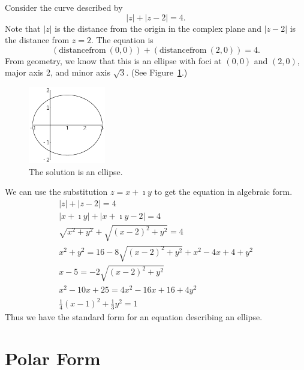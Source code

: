 \begin{Example}
  Consider the curve described by 
  \[
  |z| + |z - 2| = 4.
  \]
  Note that $|z|$ is the distance from the origin in the complex plane and
  $|z - 2|$ is the distance from $z = 2$.  The equation is
  \[ 
  (\mathrm{distance from}\ (0,0)) + (\mathrm{distance from}\ (2,0)) = 4. 
  \]
  From geometry, we know that this is an ellipse with foci at $(0,0)$
  and $(2,0)$, major axis 2, and minor axis $\sqrt{3}$. 
  (See Figure~\ref{ellipse}.)
  \begin{figure}[h!]
    \begin{center}
      \includegraphics[width=0.3\textwidth]{fcv/number/ellipse}
    \end{center}
    \caption{The solution is an ellipse.}
    \label{ellipse}
  \end{figure}

  We can use the substitution $z = x + \imath y$ to get the equation in algebraic 
  form.
  \begin{gather*}
    |z| + |z - 2| = 4 
    \\
    |x + \imath y| + |x + \imath y - 2| = 4 
    \\
    \sqrt{x^2 + y^2} + \sqrt{(x - 2)^2 + y^2} = 4 
    \\
    x^2 + y^2 = 16 - 8 \sqrt{ (x - 2)^2 + y^2 } + x^2 - 4 x + 4 + y^2 
    \\
    x - 5 = -2 \sqrt{ (x - 2)^2 + y^2 } 
    \\
    x^2 - 10 x + 25 = 4 x^2 - 16 x + 16 + 4 y^2 
    \\
    \frac{1}{4} (x - 1)^2 + \frac{1}{3} y^2 = 1
  \end{gather*}
  Thus we have the standard form for an equation describing an ellipse.
\end{Example}






\section{Polar Form}





